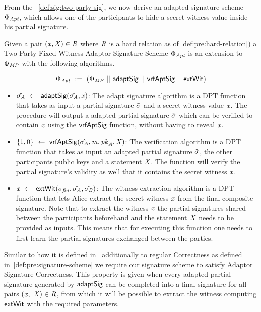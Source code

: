 From the ~\cref{def:sig:two-party-sig}, we now derive an adapted signature scheme $\Phi_{\mathit{Apt}}$, which allows one of the participants to hide a secret witness value inside his partial signature.
\begin{definition}
    \label{def:sig:two-party-fixed-wit-apt-sig}
    Given a pair $(\mathit{x}, \mathit{X}) \in \mathit{R}$ where $\mathit{R}$ is a hard relation as of \cref{def:pre:hard-relation}) a Two Party Fixed Witness Adaptor Signature Scheme $\Phi_{\mathit{Apt}}$ is an extension to $\Phi_{\mathit{MP}}$ with the following algorithms.

    \[ \Phi_{\mathit{Apt}} ~:=~ (\Phi_{\mathit{MP}} ~||~ \mathsf{adaptSig} ~||~ \mathsf{vrfAptSig} ~||~ \mathsf{extWit}) \]

    \begin{itemize}
        \item $\hat{\sigma_{\mathit{A}}} ~\leftarrow~ \mathsf{adaptSig}(\tilde{\sigma_{\mathit{A}}}, \mathit{x})$: The adapt signature algorithm is a DPT function that takes as input a partial signature $\tilde{\sigma}$ and a secret witness value $\mathit{x}$.
        The procedure will output a adapted partial signature $\hat{\sigma}$ which can be verified to contain $\mathit{x}$ using the $\mathsf{vrfAptSig}$ function, without having to reveal $\mathit{x}$.
        \item $\{1,0\} ~\leftarrow~ \mathsf{vrfAptSig}(\hat{\sigma_{\mathit{A}}},\mathit{m},\mathit{pk}_{\mathit{A}},\mathit{X})$: The verification algorithm is a DPT function that takes as input an adapted partial signature $\hat{\sigma}$,
        the other participants public keys and a statement $\mathit{X}$. The function will verify the partial signature's validity as well that it contains the secret witness $\mathit{x}$.
        \item $\mathit{x} ~\leftarrow~ \mathsf{extWit}(\sigma_{\mathit{fin}}, \tilde{\sigma_{\mathit{A}}}, \hat{\sigma_{\mathit{B}}})$: The witness extraction algorithm is a DPT function that lets Alice extract the secret witness $\mathit{x}$ from the final composite
        signature. Note that to extract the witness $\mathit{x}$ the partial signatures shared between the participants beforehand and the statement $\mathit{X}$ needs to be provided as inputs. This means that for
        executing this function one needs to first learn the partial signatures exchanged between the parties.
    \end{itemize}
\end{definition}

Similar to how it is defined in~\cite{aumayr2020bitcoinchannels} additionally to regular Correctness as defined in~\cref{def:pre:signature-scheme} we require our signature scheme to satisfy Adaptor Signature Correctness.
This property is given when every adapted partial signature generated by $\mathsf{adaptSig}$ can be completed into a final signature for all pairs $(\mathit{x} ,~ \mathit{X}) \in \mathit{R}$, from which it will
be possible to extract the witness computing $\mathsf{extWit}$ with the required parameters.

